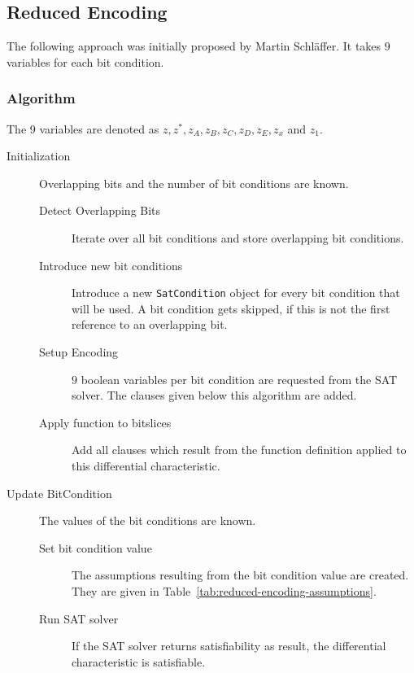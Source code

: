 \subsection{Reduced Encoding}
\label{sec:encoding:reduced-encoding}
%
The following approach was initially proposed by Martin Schläffer. It takes $9$ variables for each bit condition.

\subsubsection{Algorithm}
\label{sec:reduced-encoding-algorithm}
%
The 9 variables are denoted as $z, z^*, z_A, z_B, z_C, z_D, z_E, z_x$ and $z_1$.
%
\begin{description}
  \item[Initialization] Overlapping bits and the number of bit conditions are known.
    \begin{description}
      \item[Detect Overlapping Bits] Iterate over all bit conditions and store overlapping bit conditions.
      \item[Introduce new bit conditions] Introduce a new \texttt{SatCondition} object for every bit condition that will be used. A bit condition gets skipped, if this is not the first reference to an overlapping bit.
      \item[Setup Encoding] $9$ boolean variables per bit condition are requested from the SAT solver. The clauses given below this algorithm are added.
      \item[Apply function to bitslices] Add all clauses which result from the function definition applied to this differential characteristic.
    \end{description}
  \item[Update BitCondition] The values of the bit conditions are known.
    \begin{description}
      \item[Set bit condition value] The assumptions resulting from the bit condition value are created. They are given in Table~\ref{tab:reduced-encoding-assumptions}.
      \item[Run SAT solver] If the SAT solver returns satisfiability as result, the differential characteristic is satisfiable.
    \end{description}
\end{description}


